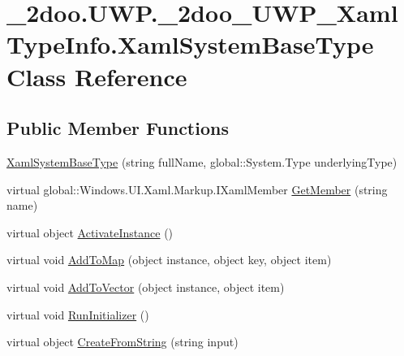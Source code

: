 \hypertarget{class__2doo_1_1_u_w_p_1_1__2doo___u_w_p___xaml_type_info_1_1_xaml_system_base_type}{
\section{\_\-2doo.UWP.\_\-2doo\_\-UWP\_\-XamlTypeInfo.XamlSystemBaseType Class Reference}
\label{class__2doo_1_1_u_w_p_1_1__2doo___u_w_p___xaml_type_info_1_1_xaml_system_base_type}
}
\subsection*{Public Member Functions}
\begin{CompactItemize}
\item 
\hyperlink{class__2doo_1_1_u_w_p_1_1__2doo___u_w_p___xaml_type_info_1_1_xaml_system_base_type_fa9a05a64a5b533a1c43f609807c88e1}{XamlSystemBaseType} (string fullName, global::System.Type underlyingType)
\item 
virtual global::Windows.UI.Xaml.Markup.IXamlMember \hyperlink{class__2doo_1_1_u_w_p_1_1__2doo___u_w_p___xaml_type_info_1_1_xaml_system_base_type_a91e6ecccfc3e0ed36fc29a64d8a15f4}{GetMember} (string name)
\item 
virtual object \hyperlink{class__2doo_1_1_u_w_p_1_1__2doo___u_w_p___xaml_type_info_1_1_xaml_system_base_type_cd2c7ef4900b02bd05eb8cb9999b9c58}{ActivateInstance} ()
\item 
virtual void \hyperlink{class__2doo_1_1_u_w_p_1_1__2doo___u_w_p___xaml_type_info_1_1_xaml_system_base_type_04b9426ea8d0f81463a9b53118ab5519}{AddToMap} (object instance, object key, object item)
\item 
virtual void \hyperlink{class__2doo_1_1_u_w_p_1_1__2doo___u_w_p___xaml_type_info_1_1_xaml_system_base_type_92cc8e8caee060a4f8d872b715f2b035}{AddToVector} (object instance, object item)
\item 
virtual void \hyperlink{class__2doo_1_1_u_w_p_1_1__2doo___u_w_p___xaml_type_info_1_1_xaml_system_base_type_c93effa41cb373120e5c1afe778752c0}{RunInitializer} ()
\item 
virtual object \hyperlink{class__2doo_1_1_u_w_p_1_1__2doo___u_w_p___xaml_type_info_1_1_xaml_system_base_type_85cd0ab3fec92dd8c407564fe441c578}{CreateFromString} (string input)
\end{CompactItemize}
